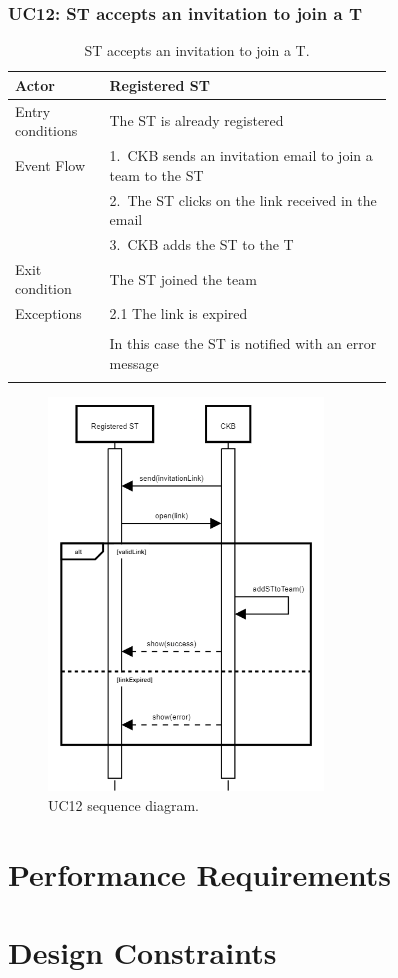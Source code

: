 \subsubsection*{UC12: ST accepts an invitation to join a T}
\begin{center}
  \begin{longtable}{l|p{0.75\linewidth}}
    \hline
    Actor & Registered ST \\
    \hline
    Entry conditions & The ST is already registered \\
    \hline
    Event Flow & 1.\ CKB sends an invitation email to join a team to the ST \\
    & 2.\ The ST clicks on the link received in the email \\
    & 3.\ CKB adds the ST to the T \\
    \hline
    Exit condition &  The ST joined the team \\
    \hline
    Exceptions & 2.1 The link is expired \\ \\
    & In this case the ST is notified with an error message \\
    \hline
    \caption{ST accepts an invitation to join a T.}
    \label{tab: ST_accepts_invitation}
  \end{longtable}

  \begin{figure} [H]
    \begin{center}
        \includegraphics[width=0.65\textwidth,height=\textheight,keepaspectratio]{Images/UseCaseDiagrams/UC12.png}
        \caption{UC12 sequence diagram.}
        \label{fig: UC12_sequence_diagram}
    \end{center}
  \end{figure}
\end{center}


\section{Performance Requirements}
\label{s:Performance_requirements}%

\section{Design Constraints}
\label{s:Design_constraints}%

